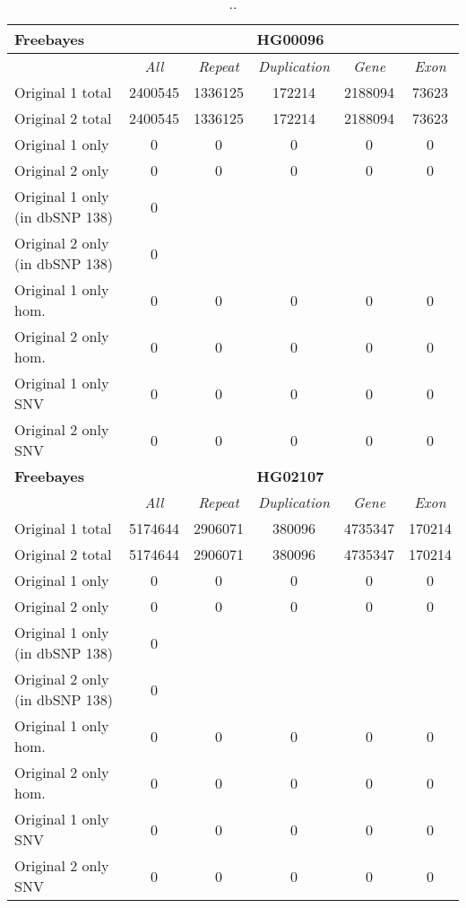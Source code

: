 \begin{table}[htb]
\caption{ .. }
\begin{center}
\begin{tabular}{|l|c||c|c|c|c|}
\hline
{\bf Freebayes} & \multicolumn{5}{|c|}{\bf HG00096} \\
\hline
\cline{2-6}
{\bf} & {\it All} & {\it Repeat} & {\it Duplication} & {\it Gene} & {\it Exon} \\
\hline
Original 1 total & 2400545 & 1336125 & 172214 & 2188094 & 73623\\ 
\hline
Original 2 total & 2400545 & 1336125 & 172214 & 2188094 & 73623\\ 
\hline
Original 1 only & 0 & 0 & 0 & 0 & 0\\ 
\hline
Original 2 only & 0 & 0 & 0 & 0 & 0\\ 
\hline
Original 1 only (in dbSNP 138) & 0 &  &  &  & \\ 
\hline
Original 2 only (in dbSNP 138) & 0 &  &  &  & \\ 
\hline
Original 1 only hom. & 0 & 0 & 0 & 0 & 0\\ 
\hline
Original 2 only hom. & 0 & 0 & 0 & 0 & 0\\ 
\hline
Original 1 only SNV & 0 & 0 & 0 & 0 & 0\\ 
\hline
Original 2 only SNV & 0 & 0 & 0 & 0 & 0\\ 
\hline
\hline
{\bf Freebayes} & \multicolumn{5}{|c|}{\bf HG02107} \\
\hline
\cline{2-6}
{\bf} & {\it All} & {\it Repeat} & {\it Duplication} & {\it Gene} & {\it Exon} \\
\hline
Original 1 total & 5174644 & 2906071 & 380096 & 4735347 & 170214\\ 
\hline
Original 2 total & 5174644 & 2906071 & 380096 & 4735347 & 170214\\ 
\hline
Original 1 only & 0 & 0 & 0 & 0 & 0\\ 
\hline
Original 2 only & 0 & 0 & 0 & 0 & 0\\ 
\hline
Original 1 only (in dbSNP 138) & 0 &  &  &  & \\ 
\hline
Original 2 only (in dbSNP 138) & 0 &  &  &  & \\ 
\hline
Original 1 only hom. & 0 & 0 & 0 & 0 & 0\\ 
\hline
Original 2 only hom. & 0 & 0 & 0 & 0 & 0\\ 
\hline
Original 1 only SNV & 0 & 0 & 0 & 0 & 0\\ 
\hline
Original 2 only SNV & 0 & 0 & 0 & 0 & 0\\ 
\hline
\end{tabular}
\end{center}
\label{tab:orig-vs-orig2-freebayes}
\end{table}


